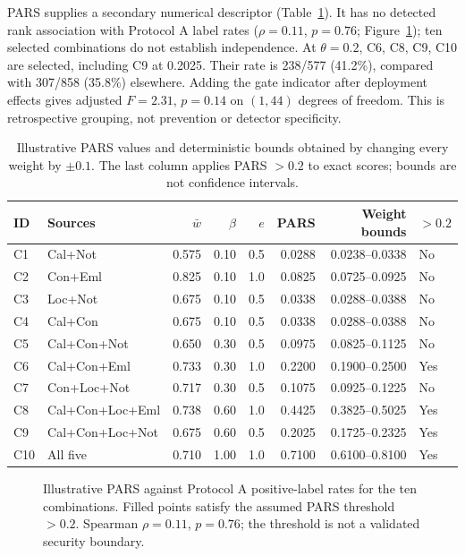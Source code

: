 PARS supplies a secondary numerical descriptor (Table~\ref{tab:pars}). It has no detected rank association with Protocol A label rates ($\rho=0.11$, $p=0.76$; Figure~\ref{fig:pars}); ten selected combinations do not establish independence. At $\theta=0.2$, C6, C8, C9, C10 are selected, including C9 at 0.2025. Their rate is 238/577 (41.2\%), compared with 307/858 (35.8\%) elsewhere. Adding the gate indicator after deployment effects gives adjusted $F=2.31$, $p=0.14$ on $(1,44)$ degrees of freedom. This is retrospective grouping, not prevention or detector specificity.

\begin{table}[width=\textwidth,pos=t]
\caption{Illustrative PARS values and deterministic bounds obtained by changing every weight by $\pm0.1$. The last column applies PARS $>0.2$ to exact scores; bounds are not confidence intervals.}\label{tab:pars}
\centering\scriptsize
\setlength{\tabcolsep}{3pt}
\renewcommand{\arraystretch}{1.08}
\begin{tabular*}{\tblwidth}{@{\extracolsep{\fill}}lp{.25\tblwidth}rrrrrl@{}}
\toprule
ID & Sources & $\bar w$ & $\beta$ & $e$ & PARS & Weight bounds & $>0.2$\\
\midrule
C1 & Cal+Not & 0.575 & 0.10 & 0.5 & 0.0288 & 0.0238--0.0338 & No\\
C2 & Con+Eml & 0.825 & 0.10 & 1.0 & 0.0825 & 0.0725--0.0925 & No\\
C3 & Loc+Not & 0.675 & 0.10 & 0.5 & 0.0338 & 0.0288--0.0388 & No\\
C4 & Cal+Con & 0.675 & 0.10 & 0.5 & 0.0338 & 0.0288--0.0388 & No\\
C5 & Cal+Con+Not & 0.650 & 0.30 & 0.5 & 0.0975 & 0.0825--0.1125 & No\\
C6 & Cal+Con+Eml & 0.733 & 0.30 & 1.0 & 0.2200 & 0.1900--0.2500 & Yes\\
C7 & Con+Loc+Not & 0.717 & 0.30 & 0.5 & 0.1075 & 0.0925--0.1225 & No\\
C8 & Cal+Con+Loc+Eml & 0.738 & 0.60 & 1.0 & 0.4425 & 0.3825--0.5025 & Yes\\
C9 & Cal+Con+Loc+Not & 0.675 & 0.60 & 0.5 & 0.2025 & 0.1725--0.2325 & Yes\\
C10 & All five & 0.710 & 1.00 & 1.0 & 0.7100 & 0.6100--0.8100 & Yes\\
\bottomrule
\end{tabular*}

\end{table}

\begin{figure}[t]
\centering
{}
\caption{Illustrative PARS against Protocol A positive-label rates for the ten combinations. Filled points satisfy the assumed PARS threshold $>0.2$. Spearman $\rho=0.11$, $p=0.76$; the threshold is not a validated security boundary.}\label{fig:pars}
\end{figure}


